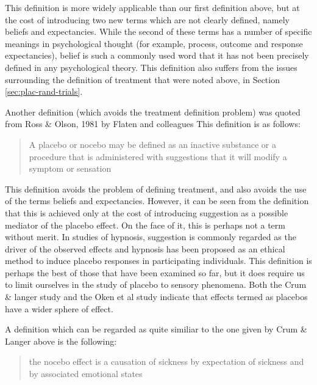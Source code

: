This definition is more widely applicable than our first definition above, but at the cost of introducing two new terms which are not clearly defined, namely beliefs and expectancies. While the second of these terms has a number of specific meanings in psychological thought (for example, process, outcome and response expectancies), belief is such a commonly used word that it has not been precisely defined in any psychological theory. This definition also suffers from the issues surrounding the definition of treatment that were noted above, in Section \ref{sec:plac-rand-trials}. 


Another definition (which avoids the treatment definition problem) was quoted from Ross \& Olson, 1981 by Flaten and colleagues \cite{Flaten1999}
This definition is as follows:

\begin{quotation}
  A placebo or nocebo may be defined as an inactive
substance or a procedure that is administered with
suggestions that it will modify a symptom or sensation
\end{quotation}

This definition avoids the problem of defining treatment, and also avoids the use of the terms beliefs and expectancies. However, it can be seen from the definition that this is achieved only at the cost of introducing suggestion as a possible mediator of the placebo effect. On the face of it, this is perhaps not a term without merit. In studies of hypnosis, suggestion is commonly regarded as the driver of the observed effects \cite{Kirsch1994} and hypnosis has been proposed as an ethical method to induce placebo responses in participating individuals. This definition is perhaps the best of those that have been examined so far, but it does require us to limit ourselves in the study of placebo to sensory phenomena. Both the Crum \& langer study and the Oken et al study indicate that effects termed as placebos have a wider sphere of effect. 

A definition which can be regarded as quite similiar to the one given by Crum \& Langer above is the following:
\begin{quotation}
the nocebo effect is  a causation of sickness by expectation of sickness and by associated emotional states
\end{quotation}

